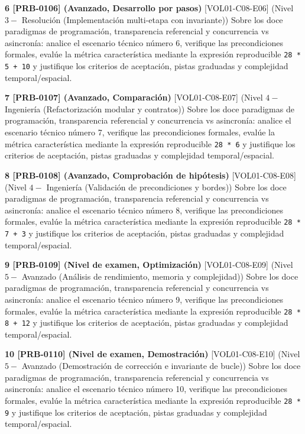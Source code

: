 \documentclass{book}
\begin{document}
\begin{tcolorbox}[title={Ejercicios}, studiumworked, breakable]
\noindent\textbf{6 [PRB-0106] (Avanzado, Desarrollo por pasos)}
[VOL01-C08-E06] (Nivel \(3 -\) Resolución (Implementación multi-etapa con invariante)) Sobre los doce paradigmas de programación, transparencia referencial y concurrencia vs asincronía: analice el escenario técnico número 6, verifique las precondiciones formales, evalúe la métrica característica mediante la expresión reproducible \texttt{28 * 5 + 10} y justifique los criterios de aceptación, pistas graduadas y complejidad temporal/espacial.

\noindent\textbf{7 [PRB-0107] (Avanzado, Comparación)}
[VOL01-C08-E07] (Nivel \(4 -\) Ingeniería (Refactorización modular y contratos)) Sobre los doce paradigmas de programación, transparencia referencial y concurrencia vs asincronía: analice el escenario técnico número 7, verifique las precondiciones formales, evalúe la métrica característica mediante la expresión reproducible \texttt{28 * 6} y justifique los criterios de aceptación, pistas graduadas y complejidad temporal/espacial.

\noindent\textbf{8 [PRB-0108] (Avanzado, Comprobación de hipótesis)}
[VOL01-C08-E08] (Nivel \(4 -\) Ingeniería (Validación de precondiciones y bordes)) Sobre los doce paradigmas de programación, transparencia referencial y concurrencia vs asincronía: analice el escenario técnico número 8, verifique las precondiciones formales, evalúe la métrica característica mediante la expresión reproducible \texttt{28 * 7 + 3} y justifique los criterios de aceptación, pistas graduadas y complejidad temporal/espacial.

\noindent\textbf{9 [PRB-0109] (Nivel de examen, Optimización)}
[VOL01-C08-E09] (Nivel \(5 -\) Avanzado (Análisis de rendimiento, memoria y complejidad)) Sobre los doce paradigmas de programación, transparencia referencial y concurrencia vs asincronía: analice el escenario técnico número 9, verifique las precondiciones formales, evalúe la métrica característica mediante la expresión reproducible \texttt{28 * 8 + 12} y justifique los criterios de aceptación, pistas graduadas y complejidad temporal/espacial.

\noindent\textbf{10 [PRB-0110] (Nivel de examen, Demostración)}
[VOL01-C08-E10] (Nivel \(5 -\) Avanzado (Demostración de corrección e invariante de bucle)) Sobre los doce paradigmas de programación, transparencia referencial y concurrencia vs asincronía: analice el escenario técnico número 10, verifique las precondiciones formales, evalúe la métrica característica mediante la expresión reproducible \texttt{28 * 9} y justifique los criterios de aceptación, pistas graduadas y complejidad temporal/espacial.


\end{tcolorbox}
\end{document}
